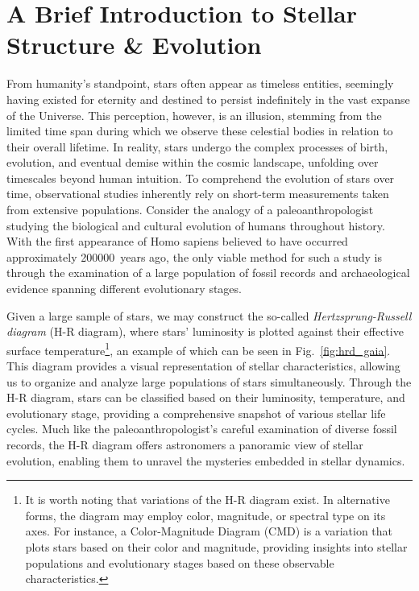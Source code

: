 \documentclass[main.tex]{subfiles}
\begin{document}
    
    {
    \adjustmtc
    \minitoc
    \newpage
    }
    
    
    
    \section{A Brief Introduction to Stellar Structure \& Evolution}\label{sec:ch1:intro}
    From humanity's standpoint, stars often appear as timeless entities, seemingly having existed for eternity and destined to persist indefinitely in the vast expanse of the Universe. This perception, however, is an illusion, stemming from the limited time span during which we observe these celestial bodies in relation to their overall lifetime. In reality, stars undergo the complex processes of birth, evolution, and eventual demise within the cosmic landscape, unfolding over timescales beyond human intuition. To comprehend the evolution of stars over time, observational studies inherently rely on short-term measurements taken from extensive populations.
    Consider the analogy of a paleoanthropologist studying the biological and cultural evolution of humans throughout history. With the first appearance of Homo sapiens believed to have occurred approximately \SI{200000}{years} ago, the only viable method for such a study is through the examination of a large population of fossil records and archaeological evidence spanning different evolutionary stages.

    Given a large sample of stars, we may construct the so-called \textit{Hertzsprung-Russell diagram} (H-R diagram), where stars' luminosity is plotted against their effective surface temperature\footnote{It is worth noting that variations of the H-R diagram exist. In alternative forms, the diagram may employ color, magnitude, or spectral type on its axes. For instance, a Color-Magnitude Diagram (CMD) is a variation that plots stars based on their color and magnitude, providing insights into stellar populations and evolutionary stages based on these observable characteristics.}, an example of which can be seen in Fig.~\ref{fig:hrd_gaia}. This diagram provides a visual representation of stellar characteristics, allowing us to organize and analyze large populations of stars simultaneously. Through the H-R diagram, stars can be classified based on their luminosity, temperature, and evolutionary stage, providing a comprehensive snapshot of various stellar life cycles. Much like the paleoanthropologist's careful examination of diverse fossil records, the H-R diagram offers astronomers a panoramic view of stellar evolution, enabling them to unravel the mysteries embedded in stellar dynamics.
\end{document}
